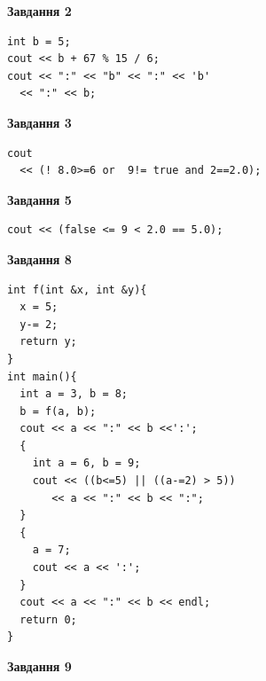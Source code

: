 \documentclass[12pt, ukrainian]{article}
\begin{document}
{\begin {large}
\begin{minipage}[t]{7.0cm}
\end{minipage}
\vline \hspace{1mm}
\begin{minipage}[t]{11.0cm}

\begin{center}
\textbf{Завдання 2}
\end{center}
\vspace{-8mm}

\begin{verbatim}
int b = 5;
cout << b + 67 % 15 / 6;
cout << ":" << "b" << ":" << 'b' 
  << ":" << b;
\end{verbatim}



\begin{center}
\textbf{Завдання 3}
\end{center}
\vspace{-8mm}

\begin{verbatim}
cout 
  << (! 8.0>=6 or  9!= true and 2==2.0);
\end{verbatim}



\begin{center}
\textbf{Завдання 5}
\end{center}
\vspace{-8mm}

\begin{verbatim}
cout << (false <= 9 < 2.0 == 5.0);
\end{verbatim}



\begin{center}
\textbf{Завдання 8}
\end{center}
\vspace{-8mm}

\begin{verbatim}
int f(int &x, int &y){
  x = 5;
  y-= 2;
  return y;
}
int main(){
  int a = 3, b = 8;
  b = f(a, b);
  cout << a << ":" << b <<':';
  {
    int a = 6, b = 9;
    cout << ((b<=5) || ((a-=2) > 5))
       << a << ":" << b << ":";
  }
  {
    a = 7;
    cout << a << ':';
  }
  cout << a << ":" << b << endl;
  return 0;
}
\end{verbatim}

\end{minipage}


\begin{minipage}[t]{7.0cm}

\begin{center}
\textbf{Завдання 9}
\end{center}
\vspace{-8mm}


\end{minipage}
\end{large}}
\end{document}
